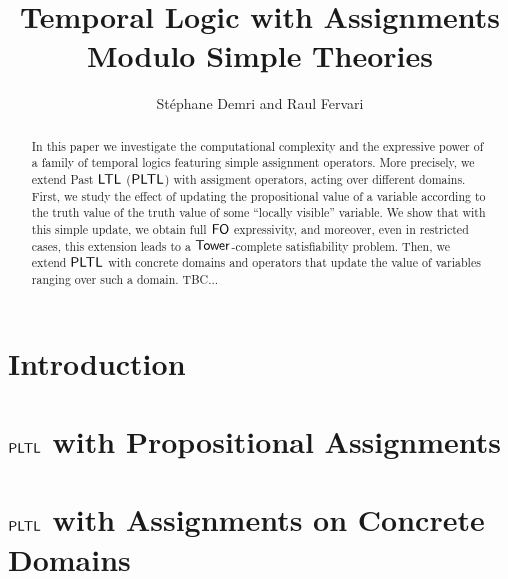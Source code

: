 \documentclass{article}
\title{Temporal Logic with Assignments Modulo Simple Theories}
\author{St\'ephane Demri and Raul Fervari}
\date{ }
\begin{document}
\maketitle 

\begin{abstract}
  In this paper we investigate the computational complexity and the expressive power of a family of temporal logics featuring simple assignment operators. More precisely, we extend Past $\textsf{LTL}$ ($\textsf{PLTL}$) with assigment operators, acting over different domains. First, we study the effect of updating the propositional value of a variable according to the truth value of the truth value of some ``locally visible'' variable. We show that with this simple update, we obtain full $\textsf{FO}$ expressivity, and moreover, even in restricted cases, this extension leads to a ${\rm\textsf{Tower}}$-complete satisfiability problem. Then, we extend $\textsf{PLTL}$ with concrete domains and operators that update the value of variables ranging over such a domain. TBC...
\end{abstract}

\section{Introduction}

\section{$\textsf{PLTL}$ with Propositional Assignments}



\section{$\textsf{PLTL}$ with Assignments on Concrete Domains}




\end{document}
